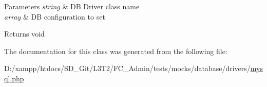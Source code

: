 \begin{DoxyParams}{Parameters}
{\em string} & D\+B Driver class name \\
\hline
{\em array} & D\+B configuration to set \\
\hline
\end{DoxyParams}
\begin{DoxyReturn}{Returns}
void 
\end{DoxyReturn}


The documentation for this class was generated from the following file\+:\begin{DoxyCompactItemize}
\item 
D\+:/xampp/htdocs/\+S\+D\+\_\+\+Git/\+L3\+T2/\+F\+C\+\_\+\+Admin/tests/mocks/database/drivers/\hyperlink{drivers_2mysql_8php}{mysql.\+php}\end{DoxyCompactItemize}
